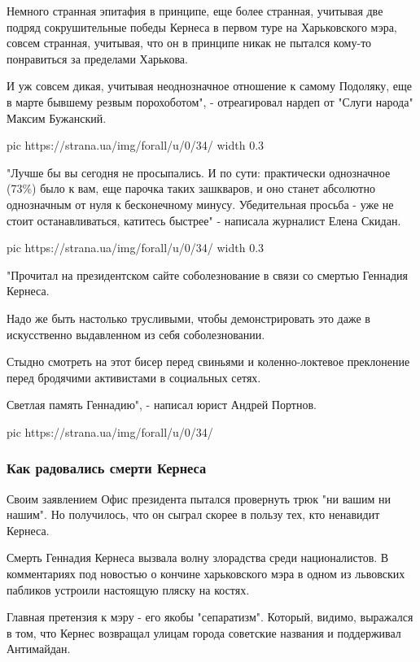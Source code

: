 Немного странная эпитафия в принципе, еще более странная, учитывая две подряд
сокрушительные победы Кернеса в первом туре на Харьковского мэра, совсем
странная, учитывая, что он в принципе никак не пытался кому-то понравиться за
пределами Харькова.

И уж совсем дикая, учитывая неоднозначное отношение к самому Подоляку, еще в
марте бывшему резвым порохоботом", - отреагировал нардеп от "Слуги народа"
Максим Бужанский.

\ifcmt
  pic https://strana.ua/img/forall/u/0/34/%
  width 0.3
\fi

"Лучше бы вы сегодня не просыпались. И по сути: практически однозначное (73\%)
было к вам, еще парочка таких зашкваров, и оно станет абсолютно однозначным от
нуля к бесконечному минусу. Убедительная просьба - уже не стоит
останавливаться, катитесь быстрее" - написала журналист Елена Скидан.

\ifcmt
  pic https://strana.ua/img/forall/u/0/34/%
  width 0.3
\fi

"Прочитал на президентском сайте соболезнование в связи со смертью Геннадия
Кернеса.

Надо же быть настолько трусливыми, чтобы демонстрировать это даже в
искусственно выдавленном из себя соболезновании.

Стыдно смотреть на этот бисер перед свиньями и коленно-локтевое преклонение
перед бродячими активистами в социальных сетях.

Светлая память Геннадию", - написал юрист Андрей Портнов.

\ifcmt
pic https://strana.ua/img/forall/u/0/34/%
\fi

\subsubsection{Как радовались смерти Кернеса}

Своим заявлением Офис президента пытался провернуть трюк "ни вашим ни нашим".
Но получилось, что он сыграл скорее в пользу тех, кто ненавидит Кернеса. 

Смерть Геннадия Кернеса вызвала волну злорадства среди националистов. В
комментариях под новостью о кончине харьковского мэра в одном из львовских
пабликов устроили настоящую пляску на костях.

Главная претензия к мэру - его якобы "сепаратизм". Который, видимо, выражался в
том, что Кернес возвращал улицам города советские названия и поддерживал
Антимайдан. 

